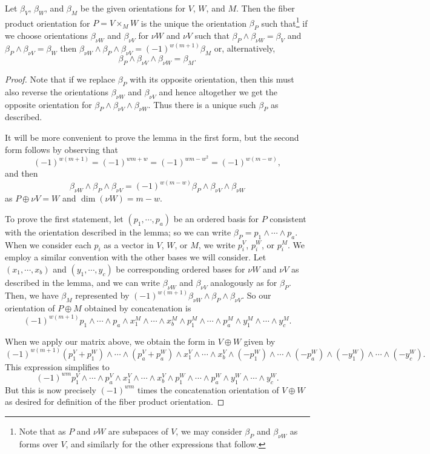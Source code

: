 \begin{proposition}\label{P: orient intersection}
	Let $\beta_V$, $\beta_W$, and $\beta_M$ be the given orientations for $V$, $W$, and $M$.
	Then the fiber product orientation for $P=V\times_MW$ is the unique the orientation $\beta_P$ such that\footnote{Note that as $P$ and $\nu W$ are subspaces of $V$, we may consider $\beta_P$ and $\beta_{\nu W}$ as forms over $V$, and similarly for the other expressions that follow.} if we choose orientations $\beta_{\nu W}$ and $\beta_{\nu V}$ for $\nu W$ and $\nu V$ such that $\beta_P\wedge \beta_{\nu W}=\beta_V$ and $\beta_P\wedge \beta_{\nu V}=\beta_W$ then $\beta_{\nu W}\wedge \beta_P\wedge \beta_{\nu V}=(-1)^{w(m+1)}\beta_M$ or, alternatively, $$ \beta_P\wedge \beta_{\nu V}\wedge \beta_{\nu W}=\beta_M.$$
\end{proposition}

\begin{proof}
	Note that if we replace $\beta_P$ with its opposite orientation, then this must also reverse the orientations $\beta_{\nu W}$ and $\beta_{\nu V}$ and hence altogether we get the opposite orientation for $\beta_P\wedge \beta_{\nu V}\wedge \beta_{\nu W}$.
	Thus there is a unique such $\beta_P$ as described.

	It will be more convenient to prove the lemma in the first form, but the second form follows by observing that $$(-1)^{w(m+1)}=(-1)^{wm+w}=(-1)^{wm-w^2}=(-1)^{w(m-w)},$$
	and then
	$$\beta_{\nu W}\wedge \beta_P\wedge \beta_{\nu V}=(-1)^{w(m-w)} \beta_P\wedge \beta_{\nu V}\wedge \beta_{\nu W}$$
	as $P\oplus \nu V=W$ and $\dim(\nu W)=m-w$.

	To prove the first statement, let $(p_1,\cdots,p_a)$ be an ordered basis for $P$ consistent with the orientation described in the lemma; so we can write $\beta_P=p_1\wedge\cdots \wedge p_a$.
	When we consider each $p_i$ as a vector in $V$, $W$, or $M$, we write $p_i^V$, $p_i^W$, or $p_i^M$.
	We employ a similar convention with the other bases we will consider.
	Let $(x_1,\cdots,x_b)$ and $(y_1,\cdots,y_c)$ be corresponding ordered bases for $\nu W$ and $\nu V$ as described in the lemma, and we can write $\beta_{\nu W}$ and $\beta_{\nu V}$ analogously as for $\beta_P$.
	Then, we have $\beta_M$ represented by $(-1)^{w(m+1)} \beta_{\nu W}\wedge \beta_P\wedge \beta_{\nu V}.$ So our orientation of $P\oplus M$ obtained by concatenation is
	$$(-1)^{w(m+1)} p_1\wedge\cdots \wedge p_a\wedge x^M_1\wedge\cdots \wedge x^M_b\wedge p^M_1\wedge\cdots \wedge p^M_a\wedge y^M_1\wedge\cdots \wedge y^M_c.$$

	When we apply our matrix above, we obtain the form in $V\oplus W$ given by
	$$(-1)^{w(m+1)} (p^V_1+p^W_1)\wedge\cdots \wedge (p^V_a+p^W_a)\wedge x^V_1\wedge\cdots \wedge x^V_b\wedge (- p^W_1)\wedge\cdots \wedge (-p^W_a)\wedge (-y^W_1)\wedge\cdots \wedge(- y^W_c).
	$$
	This expression simplifies to
	$$(-1)^{wm} p^V_1\wedge\cdots \wedge p^V_a\wedge x^V_1\wedge\cdots \wedge x^V_b\wedge p^W_1\wedge\cdots \wedge p^W_a\wedge y^W_1\wedge\cdots \wedge y^W_c.
	$$
	But this is now precisely $(-1)^{wm} $ times the concatenation orientation of $V\oplus W$ as desired for definition of the fiber product orientation.
\end{proof}

